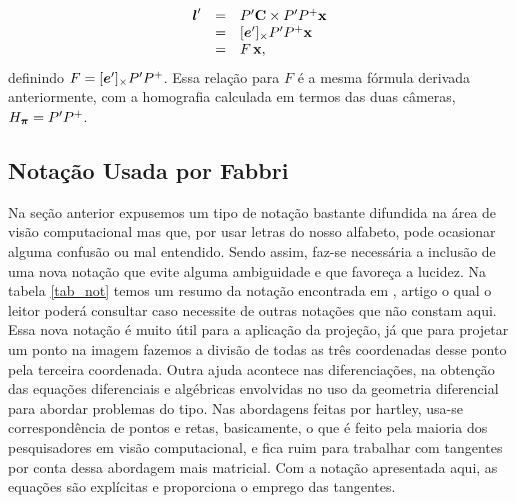 \begin{equation*}
\begin{array}{rcl}
\boldsymbol{l}'&=&P'{\bf C} \times P'P^+\mathbf{x}\\
&=&[\boldsymbol{e}']_\times P'P^+\mathbf{x}\\
&=&F\,\mathbf{x},
\end{array}
\end{equation*}
definindo $F=[\boldsymbol{e}']_\times P'P^+$. Essa relação para $F$ é a mesma fórmula derivada anteriormente, com a homografia calculada em termos das duas câmeras, $H_{\boldsymbol{\pi}}=P'P^+$.


\subsection{Notação Usada por Fabbri}

Na seção anterior expusemos um tipo de notação bastante difundida na área de visão computacional mas que, por usar letras do nosso alfabeto, pode ocasionar alguma confusão ou mal entendido. Sendo assim, faz-se necessária a inclusão de uma nova notação que evite alguma ambiguidade e que favoreça a lucidez. Na tabela \ref{tab_not} temos um resumo da notação encontrada em \cite{Fabbri:Kimia:IJCV2015}, artigo o qual o leitor poderá consultar caso necessite de outras notações que não constam aqui. Essa nova notação é muito útil para a aplicação da projeção, já que para projetar um ponto na imagem fazemos a divisão de todas as três coordenadas desse ponto pela terceira coordenada. Outra ajuda acontece nas diferenciações, na obtenção das equações diferenciais e algébricas envolvidas no uso da geometria diferencial para abordar problemas do tipo. Nas abordagens feitas por hartley, usa-se correspondência de pontos e retas, basicamente, o que é feito pela maioria dos pesquisadores em visão computacional, e fica ruim para trabalhar com tangentes por conta dessa abordagem mais matricial. Com a notação apresentada aqui, as equações são explícitas e proporciona o emprego das tangentes.


